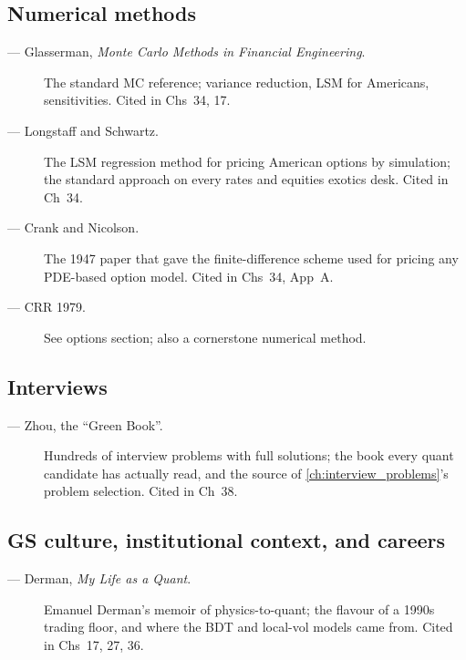 \subsection{Numerical methods}

\begin{description}
  \item[\citet{glasserman2004monte} --- Glasserman, \emph{Monte
    Carlo Methods in Financial Engineering}.] The standard MC
    reference; variance reduction, LSM for Americans, sensitivities.
    Cited in Chs~34, 17.
  \item[\citet{longstaffschwartz2001} --- Longstaff and Schwartz.]
    The LSM regression method for pricing American options by
    simulation; the standard approach on every rates and equities
    exotics desk. Cited in Ch~34.
  \item[\citet{cranknicolson1947} --- Crank and Nicolson.] The 1947
    paper that gave the finite-difference scheme used for pricing
    any PDE-based option model. Cited in Chs~34, App~A.
  \item[\citet{coxrossrubinstein1979} --- CRR 1979.] See options
    section; also a cornerstone numerical method.
\end{description}

\subsection{Interviews}

\begin{description}
  \item[\citet{zhou2020quant} --- Zhou, the ``Green Book''.] Hundreds
    of interview problems with full solutions; the book every quant
    candidate has actually read, and the source of \cref{ch:interview_problems}'s
    problem selection. Cited in Ch~38.
\end{description}

\subsection{GS culture, institutional context, and careers}

\begin{description}
  \item[\citet{derman2004mylife} --- Derman, \emph{My Life as a
    Quant}.] Emanuel Derman's memoir of physics-to-quant; the
    flavour of a 1990s trading floor, and where the BDT and local-vol
    models came from. Cited in Chs~17, 27, 36.
\end{description}

